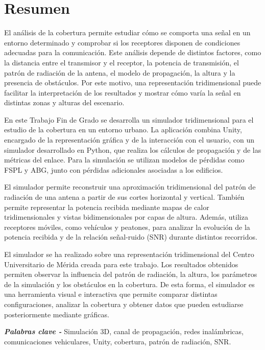 \renewcommand{\keywords}{{\itshape \bfseries Palabras clave - }}
\chapter*{Resumen} 

El análisis de la cobertura permite estudiar cómo se comporta una señal en un entorno determinado y comprobar si los receptores disponen de condiciones adecuadas para la comunicación. Este análisis depende de distintos factores, como la distancia entre el transmisor y el receptor, la potencia de transmisión, el patrón de radiación de la antena, el modelo de propagación, la altura y la presencia de obstáculos. Por este motivo, una representación tridimensional puede facilitar la interpretación de los resultados y mostrar cómo varía la señal en distintas zonas y alturas del escenario.

En este Trabajo Fin de Grado se desarrolla un simulador tridimensional para el estudio de la cobertura en un entorno urbano. La aplicación combina Unity, encargado de la representación gráfica y de la interacción con el usuario, con un simulador desarrollado en Python, que realiza los cálculos de propagación y de las métricas del enlace. Para la simulación se utilizan modelos de pérdidas como FSPL y ABG, junto con pérdidas adicionales asociadas a los edificios.

El simulador permite reconstruir una aproximación tridimensional del patrón de radiación de una antena a partir de sus cortes horizontal y vertical. También permite representar la potencia recibida mediante mapas de calor tridimensionales y vistas bidimensionales por capas de altura. Además, utiliza receptores móviles, como vehículos y peatones, para analizar la evolución de la potencia recibida y de la relación señal-ruido (SNR) durante distintos recorridos.

El simulador se ha realizado sobre una representación tridimensional del Centro Universitario de Mérida creada para este trabajo. Los resultados obtenidos permiten observar la influencia del patrón de radiación, la altura, los parámetros de la simulación y los obstáculos en la cobertura. De esta forma, el simulador es una herramienta visual e interactiva que permite comparar distintas configuraciones, analizar la cobertura y obtener datos que pueden estudiarse posteriormente mediante gráficas.


\keywords{Simulación 3D, canal de propagación, redes inalámbricas, comunicaciones vehiculares, Unity, cobertura, patrón de radiación, SNR.}
